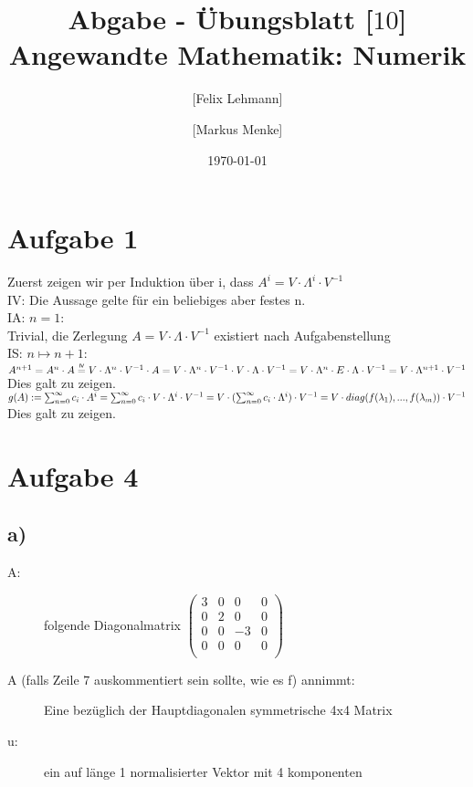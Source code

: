\documentclass[10pt,a4paper]{article}
\newcommand\iv{\mathrel{\overset{\makebox[0pt]{\mbox{\normalfont\tiny\sffamily IV}}}{=}}}
\begin{document}
\title{Abgabe - Übungsblatt [$10$]\\
\small{Angewandte Mathematik: Numerik}}
\author{ [Felix Lehmann] \and [Markus Menke]}
\date{\today}
\maketitle

\section*{Aufgabe 1}
Zuerst zeigen wir per Induktion über i, dass $A^{i} = V \cdot \Lambda^{i} \cdot V^{-1}$\\
IV: Die Aussage gelte für ein beliebiges aber festes n.\\
IA: $n = 1$:\\
Trivial, die Zerlegung $A = V \cdot \Lambda \cdot V^{-1}$ existiert nach Aufgabenstellung\\
IS: $n \mapsto n+1$:\\
$A^{n+1} = A^{n} \cdot A \iv V \cdot \Lambda^{n} \cdot V^{-1} \cdot A = V \cdot \Lambda^{n} \cdot V^{-1} \cdot V \cdot \Lambda \cdot V^{-1}\\
= V \cdot \Lambda^{n} \cdot E \cdot \Lambda \cdot V^{-1} = V \cdot \Lambda^{n+1} \cdot V^{-1}$\\
Dies galt zu zeigen.\\

$g(A):=  \sum_{n=0}^{\infty} c_{i} \cdot A^{i} = \sum_{n=0}^{\infty} c_{i} \cdot V \cdot \Lambda^{i} \cdot V^{-1}\\
= V \cdot (\sum_{n=0}^{\infty} c_{i}\cdot\Lambda^{i}) \cdot V^{-1} = V \cdot diag(f(\lambda_{1}),...,f(\lambda_{m})) \cdot V^{-1} $\\
Dies galt zu zeigen.\\

\section*{Aufgabe 4}
\subsection*{a)}
\begin{description}
    \item[A:] folgende Diagonalmatrix $\begin{pmatrix}
        3 & 0 & 0  & 0 \\
        0 & 2 & 0  & 0 \\
        0 & 0 & -3 & 0 \\
        0 & 0 & 0  & 0 \\
    \end{pmatrix}$\\
    \item[A (falls Zeile 7 auskommentiert sein sollte, wie es f) annimmt:]
        Eine bezüglich der Hauptdiagonalen symmetrische 4x4 Matrix
    \item[u:] ein auf länge 1 normalisierter Vektor mit 4 komponenten
\end{description}
\end{document}
